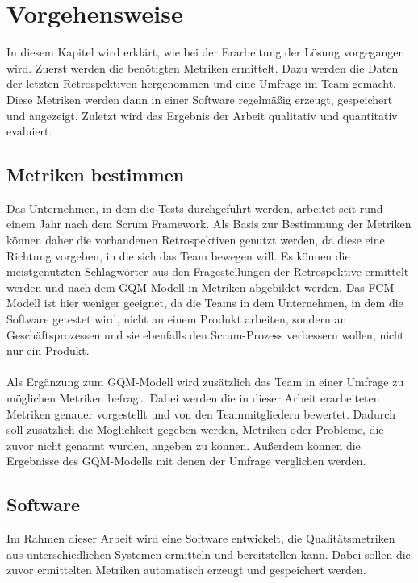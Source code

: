 \chapter{Vorgehensweise}

In diesem Kapitel wird erklärt, wie bei der Erarbeitung der Lösung vorgegangen wird.
Zuerst werden die benötigten Metriken ermittelt.
Dazu werden die Daten der letzten Retrospektiven hergenommen und eine Umfrage im Team gemacht.
Diese Metriken werden dann in einer Software regelmäßig erzeugt, gespeichert und angezeigt.
Zuletzt wird das Ergebnis der Arbeit qualitativ und quantitativ evaluiert.

\section{Metriken bestimmen}

Das Unternehmen, in dem die Tests durchgeführt werden, arbeitet seit rund einem Jahr nach dem Scrum Framework.
Als Basis zur Bestimmung der Metriken können daher die vorhandenen Retrospektiven genutzt werden, da diese eine Richtung vorgeben, in die sich das Team bewegen will.
Es können die meistgenutzten Schlagwörter aus den Fragestellungen der Retrospektive ermittelt werden und nach dem \ac{GQM}-Modell in Metriken abgebildet werden.
Das \ac{FCM}-Modell ist hier weniger geeignet, da die Teams in dem Unternehmen, in dem die Software getestet wird, nicht an einem Produkt arbeiten, sondern an Geschäftsprozessen und sie ebenfalls den Scrum-Prozess verbessern wollen, nicht nur ein Produkt.
\\
\\
Als Ergänzung zum \ac{GQM}-Modell wird zusätzlich das Team in einer Umfrage zu möglichen Metriken befragt.
Dabei werden die in dieser Arbeit erarbeiteten Metriken genauer vorgestellt und von den Teammitgliedern bewertet.
Dadurch soll zusätzlich die Möglichkeit gegeben werden, Metriken oder Probleme, die zuvor nicht genannt wurden, angeben zu können.
Außerdem können die Ergebnisse des \ac{GQM}-Modells mit denen der Umfrage verglichen werden.

\clearpage
\section{Software}

Im Rahmen dieser Arbeit wird eine Software entwickelt, die Qualitätsmetriken aus unterschiedlichen Systemen ermitteln und bereitstellen kann.
Dabei sollen die zuvor ermittelten Metriken automatisch erzeugt und gespeichert werden.

